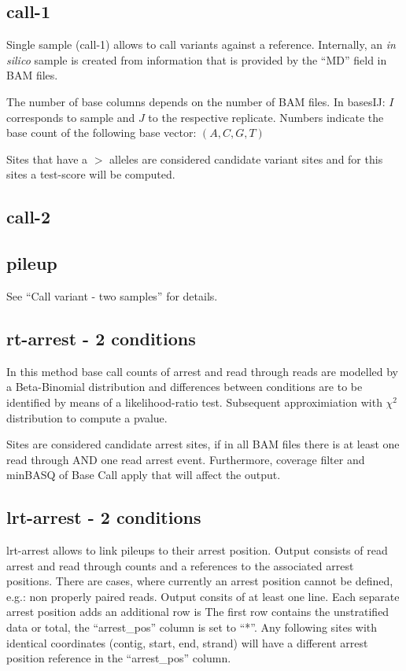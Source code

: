 \documentclass[10pt,a4paper,draft]{article}
\begin{document}
\subsection{call-1}
Single sample (call-1) allows to call variants against a reference. 
Internally, an \textit{in silico} sample is created from information that is provided by the ``MD'' field 
in BAM files.

The number of base columns depends on the number of BAM files. In basesIJ: $I$
corresponds to sample and $J$ to the respective replicate. Numbers indicate the base count of the
following base vector: $(A, C, G, T)$

Sites that have a $>$ alleles are considered candidate variant sites and for this sites a test-score will be computed.
\subsection{call-2}
\subsection{pileup}
See ``Call variant - two samples'' for details.
\subsection{rt-arrest - 2 conditions}
In this method base call counts of arrest and read through reads are modelled by a Beta-Binomial distribution and 
differences between conditions are to be identified by means of a likelihood-ratio test. Subsequent approximiation 
with $\chi^2$ distribution to compute a pvalue.

Sites are considered candidate arrest sites, if in all BAM files there is at least one read through AND one  
read arrest event. Furthermore, coverage filter and minBASQ of Base Call apply that will affect the output. 
\subsection{lrt-arrest - 2 conditions}
lrt-arrest allows to link pileups to their arrest position. Output consists of read arrest and read through counts and 
a references to the associated arrest positions. There are cases, where currently an arrest position cannot be defined, 
e.g.: non properly paired reads.
Output consits of at least one line. Each separate arrest position adds an additional row is 
The first row contains the unstratified data or total, the ``arrest\_pos'' column is set to ``*''.
Any following sites with identical coordinates (contig, start, end, strand) will have a different 
arrest position reference in the ``arrest\_pos'' column. 
\end{document}

